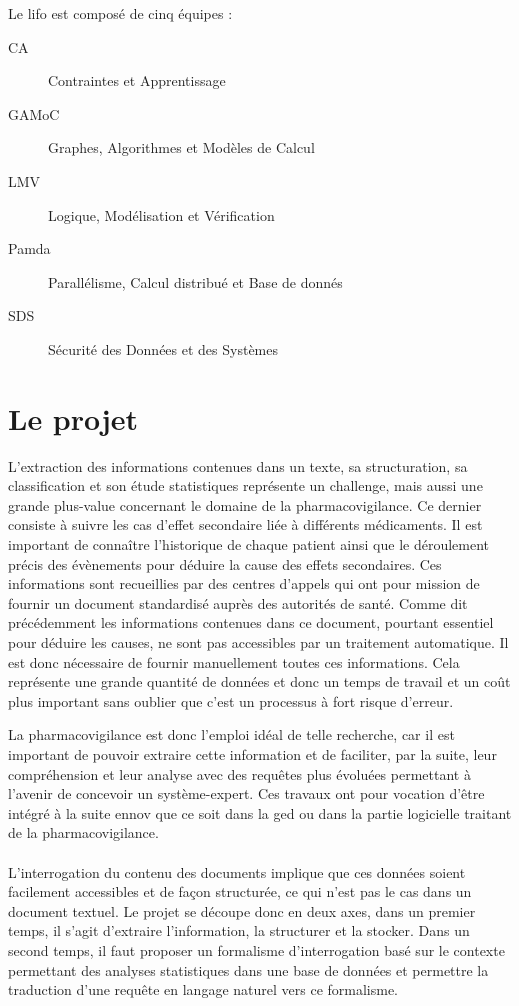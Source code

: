 Le \gls{lifo} est composé de cinq équipes :
\begin{description}
 \item[CA] Contraintes et Apprentissage
 \item[GAMoC] Graphes, Algorithmes et Modèles de Calcul
 \item[LMV] Logique, Modélisation et Vérification
 \item[Pamda] Parallélisme, Calcul distribué et Base de donnés
 \item[SDS] Sécurité des Données et des Systèmes
\end{description}

\section{Le projet}
L'extraction des informations contenues dans un texte, sa structuration, sa classification et son étude statistiques représente un challenge, mais aussi une grande plus-value concernant le domaine de la pharmacovigilance.
Ce dernier consiste à suivre les cas d'effet secondaire liée à différents médicaments.
Il est important de connaître l'historique de chaque patient ainsi que le déroulement précis des évènements pour déduire la cause des effets secondaires.
Ces informations sont recueillies par des centres d'appels qui ont pour mission de fournir un document standardisé auprès des autorités de santé.
Comme dit précédemment les informations contenues dans ce document, pourtant essentiel pour déduire les causes, ne sont pas accessibles par un traitement automatique.
Il est donc nécessaire de fournir manuellement toutes ces informations.
Cela représente une grande quantité de données et donc un temps de travail et un coût plus important sans oublier que c'est un processus à fort risque d'erreur.

La pharmacovigilance est donc l'emploi idéal de telle recherche, car il est important de pouvoir extraire cette information et de faciliter, par la suite, leur compréhension et leur analyse avec des requêtes plus évoluées permettant à l'avenir de concevoir un système-expert.
Ces travaux ont pour vocation d'être intégré à la suite \gls{ennov} que ce soit dans la \gls{ged} ou dans la partie logicielle traitant de la pharmacovigilance.

\paragraph{}
L'interrogation du contenu des documents implique que ces données soient facilement accessibles et de façon structurée, ce qui n'est pas le cas dans un document textuel.
Le projet se découpe donc en deux axes, dans un premier temps, il s'agit d'extraire l'information, la structurer et la stocker.
Dans un second temps, il faut proposer un formalisme d'interrogation basé sur le contexte permettant des analyses statistiques dans une base de données et permettre la traduction d'une requête en langage naturel vers ce formalisme.

